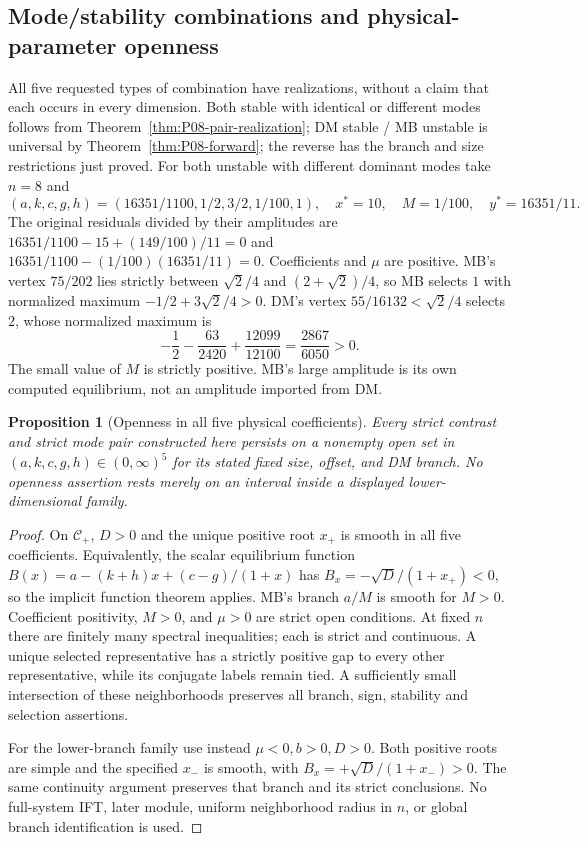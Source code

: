 \documentclass[11pt]{article}
\newtheorem{proposition}[theorem]{Proposition}
\theoremstyle{definition}
\theoremstyle{remark}
\begin{document}
\subsection{Mode/stability combinations and physical-parameter openness}
All five requested types of combination have realizations, without a
claim that each occurs in every dimension. Both stable with identical
or different modes follows from Theorem~\ref{thm:P08-pair-realization};
DM stable / MB unstable is universal by Theorem~\ref{thm:P08-forward};
the reverse has the branch and size restrictions just proved.
For both unstable with different dominant modes take $n=8$ and
\begin{equation}
 (a,k,c,g,h)=(16351/1100,1/2,3/2,1/100,1),\quad
 x^*=10,\quad M=1/100,\quad y^*=16351/11.
 \label{eq:P08-both-unstable}
\end{equation}
The original residuals divided by their amplitudes are
$16351/1100-15+(149/100)/11=0$ and
$16351/1100-(1/100)(16351/11)=0$. Coefficients and $\mu$ are positive.
MB's vertex $75/202$ lies strictly between $\sqrt2/4$ and
$(2+\sqrt2)/4$, so MB selects $1$ with normalized maximum
$-1/2+3\sqrt2/4>0$. DM's vertex $55/16132<\sqrt2/4$ selects $2$,
whose normalized maximum is
\[
 -\frac12-\frac{63}{2420}+\frac{12099}{12100}
 =\frac{2867}{6050}>0.
\]
The small value of $M$ is strictly positive. MB's large amplitude is
its own computed equilibrium, not an amplitude imported from DM.

\begin{proposition}[Openness in all five physical coefficients]
\label{prop:P08-open}
Every strict contrast and strict mode pair constructed here persists
on a nonempty open set in $(a,k,c,g,h)\in(0,\infty)^5$ for its stated
fixed size, offset, and DM branch. No openness assertion rests merely
on an interval inside a displayed lower-dimensional family.
\end{proposition}
\begin{proof}
On $\mathcal C_+$, $D>0$ and the unique positive root $x_+$ is smooth
in all five coefficients. Equivalently, the scalar equilibrium function
$B(x)=a-(k+h)x+(c-g)/(1+x)$ has
$B_x=-\sqrt D/(1+x_+)<0$, so the implicit function theorem applies.
MB's branch $a/M$ is smooth for $M>0$. Coefficient positivity,
$M>0$, and $\mu>0$ are strict open conditions. At fixed $n$ there
are finitely many spectral inequalities; each is strict and continuous.
A unique selected representative has a strictly positive gap to every
other representative, while its conjugate labels remain tied.
A sufficiently small intersection of these neighborhoods preserves all
branch, sign, stability and selection assertions.

For the lower-branch family use instead $\mu<0,b>0,D>0$.
Both positive roots are simple and the specified $x_-$ is smooth, with
$B_x=+\sqrt D/(1+x_-)>0$. The same continuity argument preserves
that branch and its strict conclusions. No full-system IFT, later
module, uniform neighborhood radius in $n$, or global branch
identification is used.
\end{proof}
\end{document}
